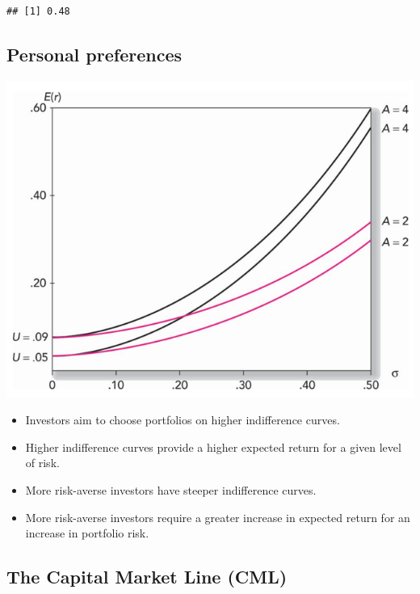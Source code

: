 \documentclass[
]{book}
\providecommand{\tightlist}{%
  \setlength{\itemsep}{0pt}\setlength{\parskip}{0pt}}
\begin{document}
\begin{verbatim}
## [1] 0.48
\end{verbatim}

\hypertarget{personal-preferences}{%
\subsection{Personal preferences}\label{personal-preferences}}

\includegraphics{Resources/capaloocation3.png}

\begin{itemize}
\tightlist
\item
  Investors aim to choose portfolios on higher indifference curves.
\item
  Higher indifference curves provide a higher expected return for a given level of risk.
\item
  More risk-averse investors have steeper indifference curves.
\item
  More risk-averse investors require a greater increase in expected return for an increase in portfolio risk.
\end{itemize}

\hypertarget{the-capital-market-line-cml}{%
\subsection{The Capital Market Line (CML)}\label{the-capital-market-line-cml}}
\end{document}
